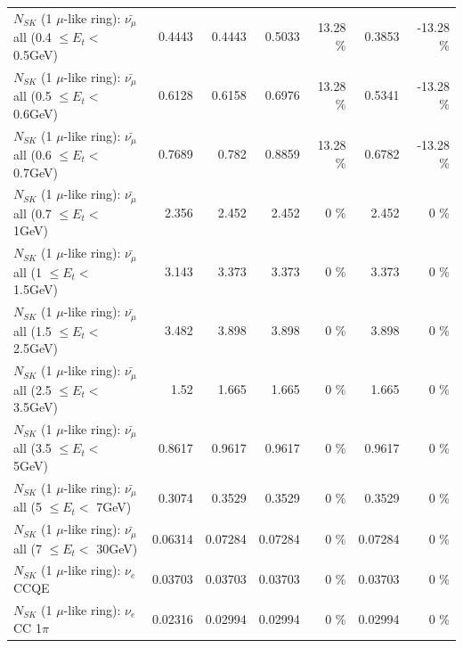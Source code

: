 \begin{table}
\begin{tabular}{| l | r | r | r  r | r  r |}
 $N_{SK}$ (1 $\mu$-like ring): $\bar{\nu_{\mu}}$ all (0.4 $\leq E_{t} <$ 0.5GeV) &          0.4443 &          0.4443 &          0.5033 &    13.28 \%  &          0.3853 &   -13.28 \%  \\ 
 $N_{SK}$ (1 $\mu$-like ring): $\bar{\nu_{\mu}}$ all (0.5 $\leq E_{t} <$ 0.6GeV) &          0.6128 &          0.6158 &          0.6976 &    13.28 \%  &          0.5341 &   -13.28 \%  \\ 
 $N_{SK}$ (1 $\mu$-like ring): $\bar{\nu_{\mu}}$ all (0.6 $\leq E_{t} <$ 0.7GeV) &          0.7689 &           0.782 &          0.8859 &    13.28 \%  &          0.6782 &   -13.28 \%  \\ 
   $N_{SK}$ (1 $\mu$-like ring): $\bar{\nu_{\mu}}$ all (0.7 $\leq E_{t} <$ 1GeV) &           2.356 &           2.452 &           2.452 &        0 \%  &           2.452 &        0 \%  \\ 
   $N_{SK}$ (1 $\mu$-like ring): $\bar{\nu_{\mu}}$ all (1 $\leq E_{t} <$ 1.5GeV) &           3.143 &           3.373 &           3.373 &        0 \%  &           3.373 &        0 \%  \\ 
 $N_{SK}$ (1 $\mu$-like ring): $\bar{\nu_{\mu}}$ all (1.5 $\leq E_{t} <$ 2.5GeV) &           3.482 &           3.898 &           3.898 &        0 \%  &           3.898 &        0 \%  \\ 
 $N_{SK}$ (1 $\mu$-like ring): $\bar{\nu_{\mu}}$ all (2.5 $\leq E_{t} <$ 3.5GeV) &            1.52 &           1.665 &           1.665 &        0 \%  &           1.665 &        0 \%  \\ 
   $N_{SK}$ (1 $\mu$-like ring): $\bar{\nu_{\mu}}$ all (3.5 $\leq E_{t} <$ 5GeV) &          0.8617 &          0.9617 &          0.9617 &        0 \%  &          0.9617 &        0 \%  \\ 
     $N_{SK}$ (1 $\mu$-like ring): $\bar{\nu_{\mu}}$ all (5 $\leq E_{t} <$ 7GeV) &          0.3074 &          0.3529 &          0.3529 &        0 \%  &          0.3529 &        0 \%  \\ 
    $N_{SK}$ (1 $\mu$-like ring): $\bar{\nu_{\mu}}$ all (7 $\leq E_{t} <$ 30GeV) &         0.06314 &         0.07284 &         0.07284 &        0 \%  &         0.07284 &        0 \%  \\ 
\hline
\hline
\hline
                                      $N_{SK}$ (1 $\mu$-like ring): $\nu_e$ CCQE &         0.03703 &         0.03703 &         0.03703 &        0 \%  &         0.03703 &        0 \%  \\ 
                                 $N_{SK}$ (1 $\mu$-like ring): $\nu_e$ CC 1$\pi$ &         0.02316 &         0.02994 &         0.02994 &        0 \%  &         0.02994 &        0 \%  \\ 

\end{tabular}
\end{table}
